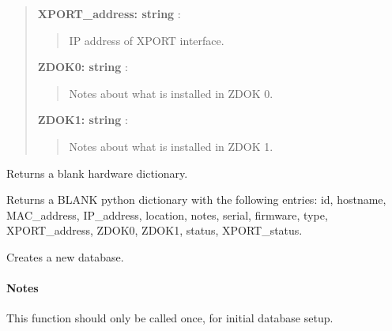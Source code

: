 \documentclass[letterpaper,10pt,english]{sphinxmanual}
\begin{document}
\begin{fulllineitems}
\begin{quote}
\begin{description}
\textbf{XPORT\_address: string} :
\begin{quote}

IP address of XPORT interface.
\end{quote}

\textbf{ZDOK0: string} :
\begin{quote}

Notes about what is installed in ZDOK 0.
\end{quote}

\textbf{ZDOK1: string} :
\begin{quote}

Notes about what is installed in ZDOK 1.
\end{quote}

\end{description}\end{quote}

\end{fulllineitems}



\begin{fulllineitems}
\label{index:roachnest_helpers.dbblank}
Returns a blank hardware dictionary.

Returns a BLANK python dictionary with the following entries:
id, hostname, MAC\_address, IP\_address, location, notes, serial, firmware, type,
XPORT\_address, ZDOK0, ZDOK1, status, XPORT\_status.

\end{fulllineitems}



\begin{fulllineitems}
\label{index:roachnest_helpers.dbcreate}
Creates a new database.
\paragraph{Notes}

This function should only be called once, for initial database setup.

\end{fulllineitems}


\end{document}
